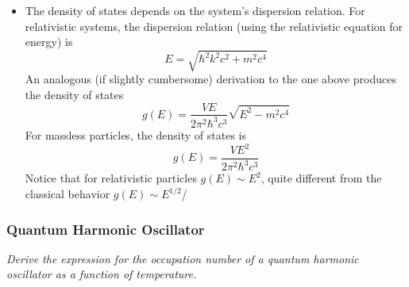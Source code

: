\documentclass[11pt, a4paper]{article}
\begin{document}
\begin{itemize}
	\item The density of states depends on the system's dispersion relation. For relativistic systems, the dispersion relation (using the relativistic equation for energy) is
	\begin{equation*}
		E = \sqrt{\hbar^{2}k^{2}c^{2} + m^{2}c^{4}}
	\end{equation*}
	An analogous (if slightly cumbersome) derivation to the one above produces the density of states
	\begin{equation*}
		g(E) = \frac{VE}{2\pi^{2}\hbar^{3}c^{3}} \sqrt{E^{2} - m^{2}c^{4}}
	\end{equation*}
	For massless particles, the density of states is
	\begin{equation*}
		g(E) = \frac{VE^{2}}{2\pi^{2}\hbar^{3}c^{3}}
	\end{equation*}
	Notice that for relativistic particles $ g(E) \sim E^{2} $, quite different from the classical behavior $ g(E) \sim E^{1/2} $/
\end{itemize}

\subsubsection{Quantum Harmonic Oscillator} \label{sss:quantum_harm_osc}
\textit{Derive the expression for the occupation number of a quantum harmonic oscillator as a function of temperature.}
	
\end{document}
